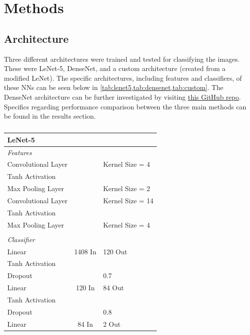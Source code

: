 \documentclass[manuscript,screen,review]{acmart}
\begin{document}
\section{Methods}

\subsection{Architecture}

Three different architectures were trained and tested for classifying the images. These were LeNet-5, DenseNet, and a custom architecture (created from a modified LeNet). The specific architectures, including features and classifiers, of these NNs can be seen below in \cref{tab:lenet5,tab:densenet,tab:custom}. The DenseNet architecture can be further investigated by visiting \href{https://github.com/andreasveit/densenet-pytorch}{this GitHub repo}. Specifics regarding performance comparison between the three main methods can be found in the results section.

\begin{table}[h!]
  \caption{}
  \label{tab:lenet5}
  \begin{tabular}{lcl}
    \textbf{LeNet-5} \\
    \toprule
    \textit{Features} \\
    \midrule
    Convolutional Layer &  & Kernel Size = 4 \\
    Tanh Activation & & \\
    Max Pooling Layer & & Kernel Size = 2\\
    Convolutional Layer &  & Kernel Size = 14 \\
    Tanh Activation & & \\
    Max Pooling Layer & & Kernel Size = 4\\
     & & \\
    \textit{Classifier} \\
    \midrule
    Linear & 1408 In & 120 Out\\
    Tanh Activation & & \\
    Dropout & & 0.7 \\
    Linear & 120 In & 84 Out\\
    Tanh Activation & & \\
    Dropout & & 0.8 \\
    Linear & 84 In & 2 Out\\
  \bottomrule
\end{tabular}
\end{table}
\end{document}
